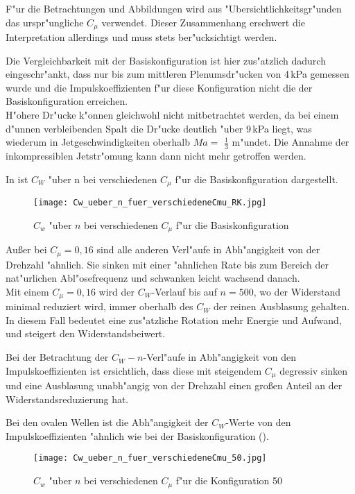 F"ur die Betrachtungen und Abbildungen wird aus "Ubersichtlichkeitsgr"unden das urspr"ungliche $C_{\mu}$ verwendet. Dieser Zusammenhang erschwert die Interpretation allerdings und muss stets ber"ucksichtigt werden.

Die Vergleichbarkeit mit der Basiskonfiguration ist hier zus"atzlich dadurch eingeschr"ankt, dass nur bis zum mittleren Plenumsdr"ucken von 4\,kPa gemessen wurde und die Impulskoeffizienten f"ur diese Konfiguration nicht die der Basiskonfiguration erreichen.\\
H"ohere Dr"ucke k"onnen gleichwohl nicht mitbetrachtet werden, da bei einem d"unnen verbleibenden Spalt die Dr"ucke deutlich "uber 9\,kPa liegt, was wiederum in Jetgeschwindigkeiten oberhalb $Ma =$ $\frac{1}{3}$ m"undet. Die Annahme der inkompressiblen Jetstr"omung kann dann nicht mehr getroffen werden.

In  ist $C_{W}$ "uber n bei verschiedenen $C_{\mu}$ f"ur die Basiskonfiguration dargestellt.

\begin{figure}[h]
	\centering
	\texttt{[image: Cw\_ueber\_n\_fuer\_verschiedeneCmu\_RK.jpg]}
	\caption{$C_{w}$ "uber $n$ bei verschiedenen $C_{\mu}$ f"ur die Basiskonfiguration}
	\label{fig:Cw/n bei Cmu RK}
\end{figure}

Au\ss{}er bei $C_{\mu}= 0,16$ sind alle anderen Verl"aufe in Abh"angigkeit von der Drehzahl "ahnlich.
Sie sinken mit einer "ahnlichen Rate bis zum Bereich der nat"urlichen Abl"osefrequenz und schwanken leicht wachsend danach.\\Mit einem $C_{\mu}= 0,16$ wird der $C_{W}$-Verlauf bis auf $n= 500$, wo der Widerstand minimal reduziert wird, immer oberhalb des $C_{W}$ der reinen Ausblasung gehalten. In diesem Fall bedeutet eine zus"atzliche Rotation mehr Energie und Aufwand, und steigert den Widerstandsbeiwert.

Bei der Betrachtung der $C_{W}-n$-Verl"aufe in Abh"angigkeit von den Impulskoeffizienten ist ersichtlich, dass diese mit steigendem $C_{\mu}$ degressiv sinken und eine Ausblasung unabh"angig von der Drehzahl einen gro\ss{}en Anteil an der Widerstandsreduzierung hat.

Bei den ovalen Wellen ist die Abh"angigkeit der $C_{W}$-Werte von den Impulskoeffizienten "ahnlich wie bei der Basiskonfiguration ().
\begin{figure}[h]
	\centering
	\texttt{[image: Cw\_ueber\_n\_fuer\_verschiedeneCmu\_50.jpg]}
	\caption{$C_{w}$ "uber $n$ bei verschiedenen $C_{\mu}$ f"ur die Konfiguration 50}
	\label{fig:Cw/n bei Cmu 50}
\end{figure}

